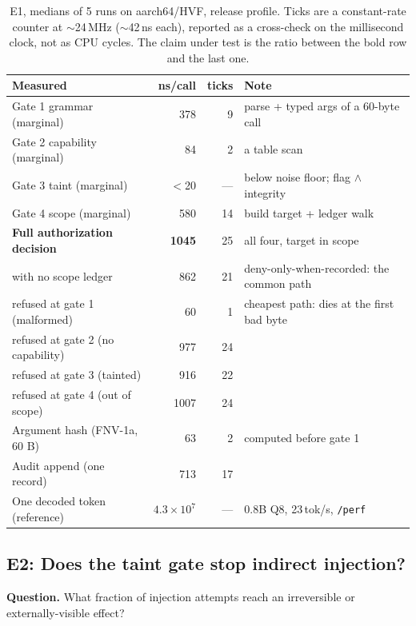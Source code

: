 \documentclass[11pt]{article}
\newcommand{\code}[1]{\texttt{#1}}
\begin{document}
\begin{table}[htb]
\centering
\small
\begin{tabular}{@{}lrrl@{}}
\toprule
\textbf{Measured} & \textbf{ns/call} & \textbf{ticks} & \textbf{Note} \\
\midrule
Gate 1 grammar (marginal)        & 378  & 9 & parse + typed args of a 60-byte call \\
Gate 2 capability (marginal)     & 84   & 2 & a table scan \\
Gate 3 taint (marginal)          & $<$20 & --- & below noise floor; flag $\wedge$ integrity \\
Gate 4 scope (marginal)          & 580  & 14 & build target + ledger walk \\
\midrule
\textbf{Full authorization decision} & \textbf{1045} & 25 & all four, target in scope \\
\quad with no scope ledger       & 862  & 21 & deny-only-when-recorded: the common path \\
\quad refused at gate 1 (malformed) & 60   & 1  & cheapest path: dies at the first bad byte \\
\quad refused at gate 2 (no capability) & 977  & 24 & \\
\quad refused at gate 3 (tainted) & 916 & 22 & \\
\quad refused at gate 4 (out of scope) & 1007 & 24 & \\
\midrule
Argument hash (FNV-1a, 60 B)     & 63   & 2  & computed before gate 1 \\
Audit append (one record)        & 713  & 17 & \\
\midrule
One decoded token (reference)    & $4.3\times10^{7}$ & --- & 0.8B Q8, 23\,tok/s, \code{/perf} \\
\bottomrule
\end{tabular}
\caption{E1, medians of 5 runs on aarch64/HVF, release profile. Ticks are a
constant-rate counter at $\sim$24\,MHz ($\sim$42\,ns each), reported as a
cross-check on the millisecond clock, not as CPU cycles. The claim under test is
the ratio between the bold row and the last one.}
\label{tab:e1}
\end{table}

\subsection{E2: Does the taint gate stop indirect injection?}
\label{sec:e2}

\textbf{Question.} What fraction of injection attempts reach an irreversible or
externally-visible effect?
\end{document}
